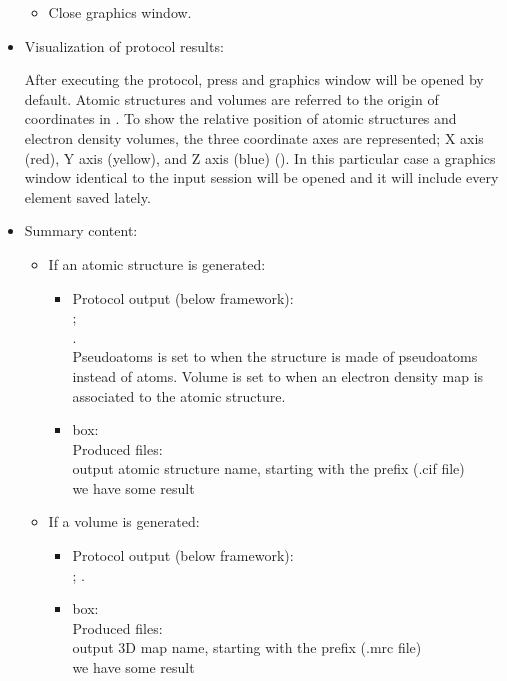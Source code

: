 \begin{itemize}
\begin{itemize}
   \item Close \chimera graphics window.

 \end{itemize}
  \item Visualization of protocol results:
  
    After executing the protocol, press  and \chimera graphics window will be opened by default. Atomic structures and volumes are referred to the origin of coordinates in \chimera. To show the relative position of atomic structures and electron density volumes, the three coordinate axes are represented; X axis (red), Y axis (yellow), and Z axis (blue) (). In this particular case a \chimera graphics window identical to the input session will be opened and it will include every element saved lately. 
   
  \item Summary content:
  
   \begin{itemize}
    \item If an atomic structure is generated:

    \begin{itemize}
     \item Protocol output (below \scipion framework):\\
                                        ;\\ .\\Pseudoatoms is set to  when the structure is made of pseudoatoms instead of atoms. Volume is set to  when an electron density map is associated to the atomic structure.
                                \item {} box:\\Produced files:\\output atomic structure name, starting with the prefix (.cif file)\\we have some result
    \end{itemize}
    \item If a volume is generated:
    
    \begin{itemize}
     \item Protocol output (below \scipion framework):\\
                                        ; .\\
                                \item {} box:\\Produced files:\\output 3D map name, starting with the prefix (.mrc file)\\we have some result
    \end{itemize}
    
   \end{itemize}
  
 \end{itemize}

